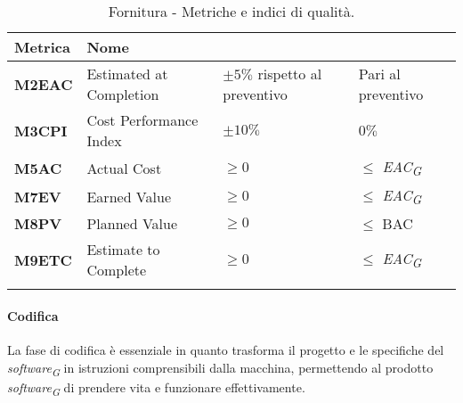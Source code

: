 \hspace{1pt}
    \begin{longtable}{|C{1.5cm}|L{3cm}|L{2.5cm}|L{2.5cm}|}
        \hline
        \textbf{Metrica} & \textbf{Nome} & \textbf{} & \textbf{} \\
        \hline
        \textbf{M2EAC} & Estimated at Completion & $\pm 5\%$ rispetto al preventivo & Pari al preventivo \\
        \hline
        \textbf{M3CPI} & Cost Performance Index & $\pm 10\%$ & $0\%$ \\
        \hline
        \textbf{M5AC} & Actual Cost & $\geq 0 $ & $ \leq$ \textit{EAC}\textsubscript{\textit{G}}  \\
        \hline
        \textbf{M7EV} & Earned Value & $\geq 0 $ & $\leq$ \textit{EAC}\textsubscript{\textit{G}}  \\
        \hline
        \textbf{M8PV} & Planned Value & $\geq 0  $ & $ \leq$ BAC  \\
        \hline
        \textbf{M9ETC} & Estimate to Complete & $\geq 0  $ & $ \leq$ \textit{EAC}\textsubscript{\textit{G}}  \\
        \hline
    \caption{Fornitura - Metriche e indici di qualità.}
    \label{tab:controllo_progetto}
\end{longtable}

\paragraph{Codifica}
La fase di codifica è essenziale in quanto trasforma il progetto e le specifiche del \textit{software}\textsubscript{\textit{G}} in istruzioni comprensibili dalla macchina, permettendo al prodotto \textit{software}\textsubscript{\textit{G}} di prendere vita e funzionare effettivamente.

